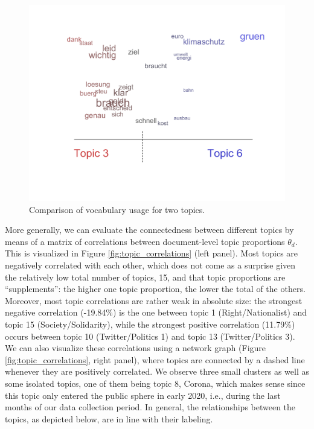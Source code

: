 \begin{figure}[h!]
  \centering
  \captionsetup{justification=centering,margin=2cm}
  \includegraphics[scale = 0.5]{../plots/4_3/vocabulary_comparison.pdf}
  \caption{Comparison of vocabulary usage for two topics.}
  \label{fig:vocabulary_comparison}
\end{figure}

More generally, we can evaluate the connectedness between different topics by means of a matrix of correlations between document-level topic proportions $\theta_d$. This is visualized in Figure \ref{fig:topic_correlations} (left panel). Most topics are negatively correlated with each other, which does not come as a surprise given the relatively low total number of topics, 15, and that topic proportions are “supplements”: the higher one topic proportion, the lower the total of the others. Moreover, most topic correlations are rather weak in absolute size: the strongest negative correlation (-19.84\%) is the one between topic 1 (Right/Nationalist) and topic 15 (Society/Solidarity), while the strongest positive correlation (11.79\%) occurs between topic 10 (Twitter/Politics 1) and topic 13 (Twitter/Politics 3). We can also visualize these correlations using a network graph (Figure \ref{fig:topic_correlations}, right panel), where topics are connected by a dashed line whenever they are positively correlated. We observe three small clusters as well as some isolated topics, one of them being topic 8, Corona, which makes sense since this topic only entered the public sphere in early 2020, i.e., during the last months of our data collection period. In general, the relationships between the topics, as depicted below, are in line with their labeling.

